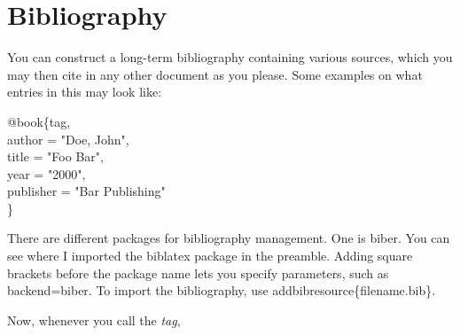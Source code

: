 \documentclass{article}
\begin{document}
\section{Bibliography}

You can construct a long-term bibliography containing various sources, which
you may then cite in any other document as you please. Some examples on what
entries in this may look like:

@book\{tag,\\
	author = "Doe, John",\\
	title = "Foo Bar",\\
	year = "2000",\\
	publisher = "Bar Publishing"\\
\}

There are different packages for bibliography management. One is biber. You can
see where I imported the biblatex package in the preamble. Adding square brackets
before the package name lets you specify parameters, such as backend=biber.
To import the bibliography, use addbibresource\{filename.bib\}.

Now, whenever you call the \emph{tag}, 
\end{document}
